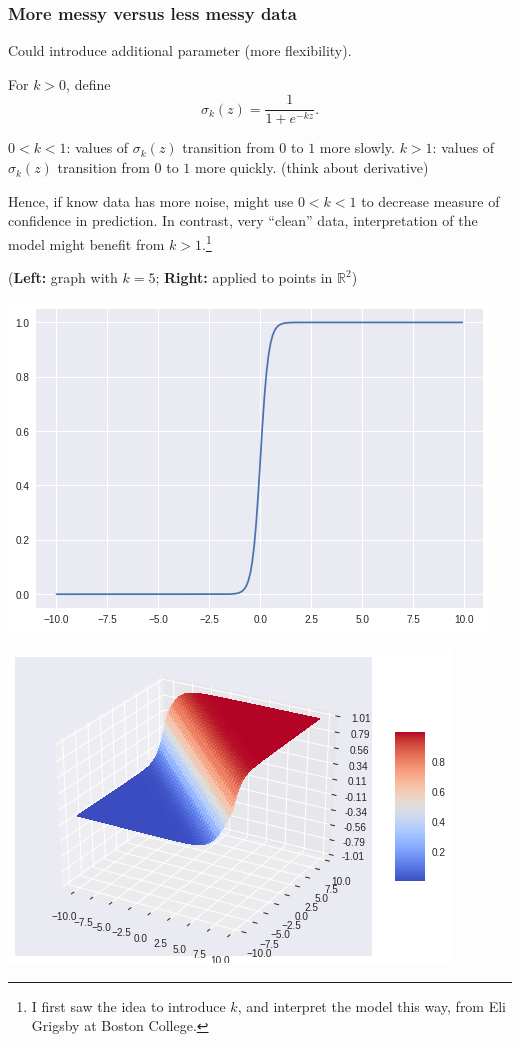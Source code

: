 \documentclass{beamer}
\theoremstyle{example}
\begin{document}
\begin{frame}
    \frametitle{More messy versus less messy data}
    Could introduce additional parameter (more flexibility).

    For $k > 0$, define \[\sigma_k(z) = \frac{1}{1+e^{-kz}}.\]

    \pause
    $0 < k < 1$: values of $\sigma_k(z)$ transition from $0$ to $1$ more slowly.\newline 
    $k > 1$: values of $\sigma_k(z)$ transition from $0$ to $1$ more quickly. (think about derivative)

    \pause
    Hence, if know data has more noise, might use $0 < k < 1$ to decrease measure of confidence in prediction. In contrast, very ``clean'' data, interpretation of the model might benefit from $k>1$.\footnote{I first saw the idea to introduce $k$, and interpret the model this way, from Eli Grigsby at Boston College.}
    
    \pause
    (\textbf{Left:} graph with $k=5$; \textbf{Right:} applied to points in $\mathbb R^2$)
    \centering
    \begin{multicols}{2}
    \includegraphics[height=0.25\textheight]{../../Images/logistic_function_kis5.png}

    \includegraphics[height=0.25\textheight]{../../Images/logistic_function_appliedtohalfspace.png}
    \end{multicols}
    
\end{frame}
\end{document}
